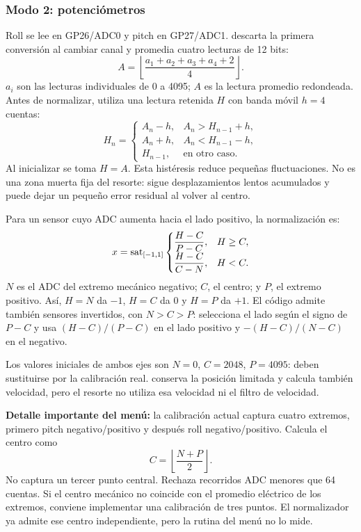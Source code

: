 \subsubsection{Modo 2: potenciómetros}
Roll se lee en GP26/ADC0 y pitch en GP27/ADC1.  descarta la primera conversión al cambiar canal y promedia cuatro lecturas de 12 bits:
\begin{equation}
A=\left\lfloor\frac{a_1+a_2+a_3+a_4+2}{4}\right\rfloor.
\end{equation}
$a_i$ son las lecturas individuales de 0 a 4095; $A$ es la lectura promedio redondeada. Antes de normalizar,  utiliza una lectura retenida $H$ con banda móvil $h=4$ cuentas:
\begin{equation}
H_n=\begin{cases}
A_n-h,&A_n>H_{n-1}+h,\\
A_n+h,&A_n<H_{n-1}-h,\\
H_{n-1},&\text{en otro caso}.
\end{cases}
\end{equation}
Al inicializar se toma $H=A$. Esta histéresis reduce pequeñas fluctuaciones. No es una zona muerta fija del resorte: sigue desplazamientos lentos acumulados y puede dejar un pequeño error residual al volver al centro.

Para un sensor cuyo ADC aumenta hacia el lado positivo, la normalización es:
\begin{equation}
x=\operatorname{sat}_{[-1,1]}\begin{cases}
\displaystyle\frac{H-C}{P-C},&H\ge C,\\[4pt]
\displaystyle\frac{H-C}{C-N},&H<C.
\end{cases}
\label{eq:pot}
\end{equation}
$N$ es el ADC del extremo mecánico negativo; $C$, el centro; y $P$, el extremo positivo. Así, $H=N$ da $-1$, $H=C$ da 0 y $H=P$ da $+1$. El código admite también sensores invertidos, con $N>C>P$: selecciona el lado según el signo de $P-C$ y usa $(H-C)/(P-C)$ en el lado positivo y $-(H-C)/(N-C)$ en el negativo.

Los valores iniciales de ambos ejes son $N=0$, $C=2048$, $P=4095$: deben sustituirse por la calibración real.  conserva la posición limitada y calcula también velocidad, pero el resorte no utiliza esa velocidad ni el filtro de velocidad.

\textbf{Detalle importante del menú:} la calibración actual captura cuatro extremos, primero pitch negativo/positivo y después roll negativo/positivo. Calcula el centro como
\begin{equation}
C=\left\lfloor\frac{N+P}{2}\right\rfloor.
\end{equation}
No captura un tercer punto central. Rechaza recorridos ADC menores que 64 cuentas. Si el centro mecánico no coincide con el promedio eléctrico de los extremos, conviene implementar una calibración de tres puntos. El normalizador ya admite ese centro independiente, pero la rutina del menú no lo mide.

